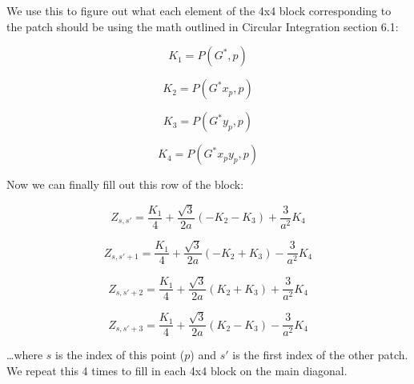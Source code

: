 \documentclass[etd,oneside,senior]{BYUPhys}
\begin{document}
We use this to figure out what each element of the 4x4 block corresponding
to the patch should be using the math outlined in Circular Integration
section 6.1:

\begin{equation}
  K_{1}=P\left(G^{*},p\right)
\end{equation}

\begin{equation}
  K_{2}=P\left(G^{*}x_{p},p\right)
\end{equation}

\begin{equation}
  K_{3}=P\left(G^{*}y_{p},p\right)
\end{equation}

\begin{equation}
  K_{4}=P\left(G^{*}x_{p}y_{p},p\right)
\end{equation}

Now we can finally fill out this row of the block:

\begin{equation}
  Z_{s,s'}=\frac{K_{1}}{4}+\frac{\sqrt{3}}{2a}\left(-K_{2}-K_{3}\right)+\frac{3}{a^{2}}K_{4}
\end{equation}

\begin{equation}
  Z_{s,s'+1}=\frac{K_{1}}{4}+\frac{\sqrt{3}}{2a}\left(-K_{2}+K_{3}\right)-\frac{3}{a^{2}}K_{4}
\end{equation}

\begin{equation}
  Z_{s,s'+2}=\frac{K_{1}}{4}+\frac{\sqrt{3}}{2a}\left(K_{2}+K_{3}\right)+\frac{3}{a^{2}}K_{4}
\end{equation}

\begin{equation}
  Z_{s,s'+3}=\frac{K_{1}}{4}+\frac{\sqrt{3}}{2a}\left(K_{2}-K_{3}\right)-\frac{3}{a^{2}}K_{4}
\end{equation}

\ldots where $s$ is the index of this point ($p$) and $s'$ is the first
index of the other patch. We repeat this 4 times to fill in each 4x4
block on the main diagonal.






\end{document}
